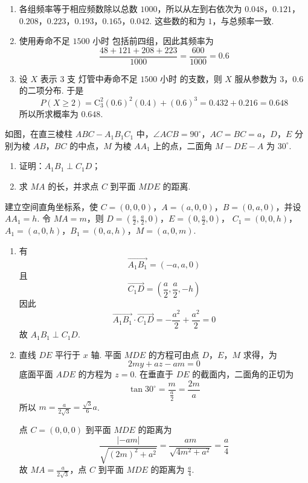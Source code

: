 \begin{solution}
\begin{enumerate}
\item 各组频率等于相应频数除以总数 \(1000\)，所以从左到右依次为
\(0.048\)，\(0.121\)，\(0.208\)，\(0.223\)，\(0.193\)，\(0.165\)，\(0.042\). 这些数的和为 \(1\)，与总频率一致.
\item 使用寿命不足 \(1500\text{ 小时}\) 包括前四组，因此其频率为
\[
\frac{48+121+208+223}{1000}=\frac{600}{1000}=0.6
\]
\item 设 \(X\) 表示 \(3\text{ 支}\) 灯管中寿命不足 \(1500\text{ 小时}\) 的支数，则 \(X\) 服从参数为 \(3\)，\(0.6\) 的二项分布. 于是
\[
P(X\geqslant2)=\mathrm C_3^2(0.6)^2(0.4)+(0.6)^3
=0.432+0.216=0.648
\]
所以所求概率为 \(0.648\).
\end{enumerate}
\end{solution}

\begin{problem}
如图，在直三棱柱 \(ABC-A_1B_1C_1\) 中，\(\angle ACB=90^{\circ}\)，\(AC=BC=a\)，\(D\)，\(E\) 分别为棱 \(AB\)，\(BC\) 的中点，\(M\) 为棱 \(AA_1\) 上的点，二面角 \(M-DE-A\) 为 \(30^{\circ}\).

\begin{enumerate}
\item 证明：\(A_1B_1\perp C_1D\)；
\item 求 \(MA\) 的长，并求点 \(C\) 到平面 \(MDE\) 的距离.
\end{enumerate}

\end{problem}

\begin{solution}
建立空间直角坐标系，使 \(C=(0,0,0)\)，\(A=(a,0,0)\)，\(B=(0,a,0)\)，并设 \(AA_1=h\). 令 \(MA=m\)，则
\(D=\left(\frac{a}{2},\frac{a}{2},0\right)\)，\(E=\left(0,\frac{a}{2},0\right)\)，
\(C_1=(0,0,h)\)，\(A_1=(a,0,h)\)，\(B_1=(0,a,h)\)，\(M=(a,0,m)\).

\begin{enumerate}
\item 有
\[
\overrightarrow{A_1B_1}=(-a,a,0)
\]
且
\[
\overrightarrow{C_1D}=\left(\frac{a}{2},\frac{a}{2},-h\right)
\]
因此
\[
\overrightarrow{A_1B_1}\cdot\overrightarrow{C_1D}
=-\frac{a^2}{2}+\frac{a^2}{2}=0
\]
故 \(A_1B_1\perp C_1D\).
\item 直线 \(DE\) 平行于 \(x\) 轴. 平面 \(MDE\) 的方程可由点 \(D\)，\(E\)，\(M\) 求得，为
\[
2my+az-am=0
\]
底面平面 \(ADE\) 的方程为 \(z=0\). 在垂直于 \(DE\) 的截面内，二面角的正切为
\[
\tan30^{\circ}=\frac{m}{\frac{a}{2}}=\frac{2m}{a}
\]
所以 \(m=\frac{a}{2\sqrt{3}}=\frac{\sqrt{3}}{6}a\).

点 \(C=(0,0,0)\) 到平面 \(MDE\) 的距离为
\[
\frac{|{-am}|}{\sqrt{(2m)^2+a^2}}
=\frac{am}{\sqrt{4m^2+a^2}}
=\frac{a}{4}
\]
故 \(MA=\frac{a}{2\sqrt{3}}\)，点 \(C\) 到平面 \(MDE\) 的距离为 \(\frac{a}{4}\).
\end{enumerate}
\end{solution}

